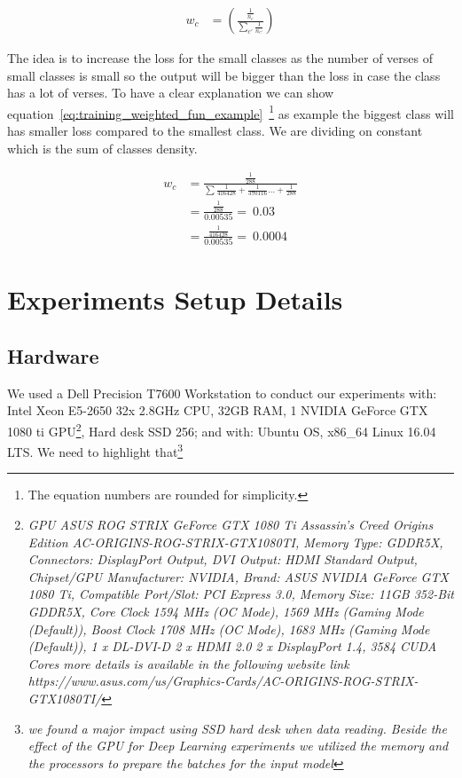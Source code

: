 \begin{align}
  w_c &= \left(\frac{\frac{1}{n_c}}{\sum_{c'} \frac{1}{n_{c'}}} \right)\label{eq:training_weighted_fun}
\end{align}

The idea is to increase the loss for the small classes as the number of verses of small classes is small so the output will be bigger than the loss in case the class has a lot of verses. To have a clear explanation we can show equation~\ref{eq:training_weighted_fun_example}~\footnote{The equation numbers are rounded for simplicity.} as example the biggest class will has smaller loss compared to the smallest class. We are dividing on constant which is the sum of classes density. 

\begin{subequations}
\begin{align}
  w_c &=  \frac{\frac{1}{288}}{\sum\frac{1}{416428}+\frac{1}{370116}\dots+\frac{1}{288}}\\
      &= \frac{\frac{1}{288}}{0.00535} = ~0.03 \\
        &= \frac{\frac{1}{416428}}{0.00535} = ~0.0004
\end{align}\label{eq:training_weighted_fun_example}
\end{subequations}
\newpage
\section{Experiments Setup Details}

\subsection{Hardware}

We used a Dell Precision T7600 Workstation to conduct our experiments with: Intel Xeon E5-2650 32x 2.8GHz CPU, 32GB RAM, 1 NVIDIA GeForce GTX 1080 ti GPU\footnote{\textit{GPU ASUS ROG STRIX GeForce GTX 1080 Ti Assassin's Creed Origins Edition AC-ORIGINS-ROG-STRIX-GTX1080TI, Memory Type: GDDR5X, Connectors: DisplayPort Output, DVI Output: HDMI Standard Output, Chipset/GPU Manufacturer: NVIDIA, Brand: ASUS NVIDIA GeForce GTX 1080 Ti, Compatible Port/Slot: PCI Express 3.0, Memory Size: 11GB 352-Bit GDDR5X, Core Clock 1594 MHz (OC Mode), 1569 MHz (Gaming Mode (Default)), Boost Clock 1708 MHz (OC Mode), 1683 MHz (Gaming Mode (Default)), 1 x DL-DVI-D 2 x HDMI 2.0 2 x DisplayPort 1.4, 3584 CUDA Cores more details is available in the following website link https://www.asus.com/us/Graphics-Cards/AC-ORIGINS-ROG-STRIX-GTX1080TI/} }, Hard desk SSD 256; and with: Ubuntu OS, x86\_64 Linux 16.04 LTS. We need to highlight that\footnote{\textit{we found a major impact using SSD hard desk when data reading. Beside the effect of the GPU for Deep Learning experiments we utilized the memory and the processors to prepare the batches for the input model}}


